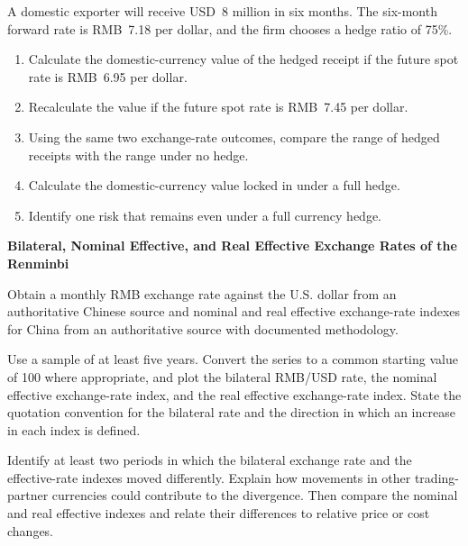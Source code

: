 \begin{enumerate}
A domestic exporter will receive USD~8 million in six months. The six-month forward rate is RMB~7.18 per dollar, and the firm chooses a hedge ratio of 75\%.

\begin{enumerate}

\item Calculate the domestic-currency value of the hedged receipt if the future spot rate is RMB~6.95 per dollar.

\item Recalculate the value if the future spot rate is RMB~7.45 per dollar.

\item Using the same two exchange-rate outcomes, compare the range of hedged receipts with the range under no hedge.

\item Calculate the domestic-currency value locked in under a full hedge.

\item Identify one risk that remains even under a full currency hedge.

\end{enumerate}

\end{enumerate}




\textbf{Bilateral, Nominal Effective, and Real Effective Exchange Rates of the Renminbi}

Obtain a monthly RMB exchange rate against the U.S. dollar from an authoritative Chinese source and nominal and real effective exchange-rate indexes for China from an authoritative source with documented methodology.

Use a sample of at least five years. Convert the series to a common starting value of 100 where appropriate, and plot the bilateral RMB/USD rate, the nominal effective exchange-rate index, and the real effective exchange-rate index. State the quotation convention for the bilateral rate and the direction in which an increase in each index is defined.

Identify at least two periods in which the bilateral exchange rate and the effective-rate indexes moved differently. Explain how movements in other trading-partner currencies could contribute to the divergence. Then compare the nominal and real effective indexes and relate their differences to relative price or cost changes.


